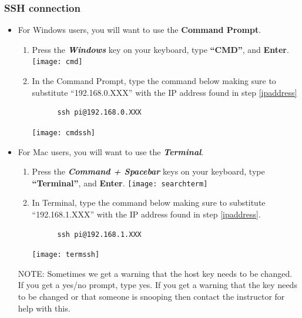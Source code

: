 \documentclass{article}
\begin{document}
\subsubsection{SSH connection}
\label{ssh}

\begin{itemize}
    \item For Windows users, you will want to use the \textbf{Command Prompt}.
    \begin{enumerate}
      \item Press the \textbf{\textit{Windows}} key on your keyboard, type \textbf{``CMD''}, and \textbf{Enter}.
\newline
\newline
\texttt{[image: cmd]}
      \item In the Command Prompt, type the command below making sure to substitute ``192.168.0.XXX'' with the IP address found in step \ref{ipaddress}
      \begin{lstlisting}
      ssh pi@192.168.0.XXX 
      \end{lstlisting}
      \texttt{[image: cmdssh]}
    \end{enumerate}
    \item For Mac users, you will want to use the \textbf{\textit{Terminal}}.
    \begin{enumerate}
      \item Press the \textbf{\textit{Command + Spacebar}} keys on your keyboard, type \textbf{``Terminal''}, and \textbf{Enter}.
  \newline
  \texttt{[image: searchterm]}
  \newline
      \item In Terminal, type the command below making sure to substitute ``192.168.1.XXX'' with the IP address found in step \ref{ipaddress}.
      \begin{lstlisting}
      ssh pi@192.168.1.XXX 
      \end{lstlisting}
  \texttt{[image: termssh]}
    \end{enumerate}
    
NOTE: Sometimes we get a warning that the host key needs to be changed. If you get a yes/no prompt, type yes. If you get a warning that the key needs to be changed or that someone is snooping then contact the instructor for help with this.  
\end{itemize}
\end{document}
